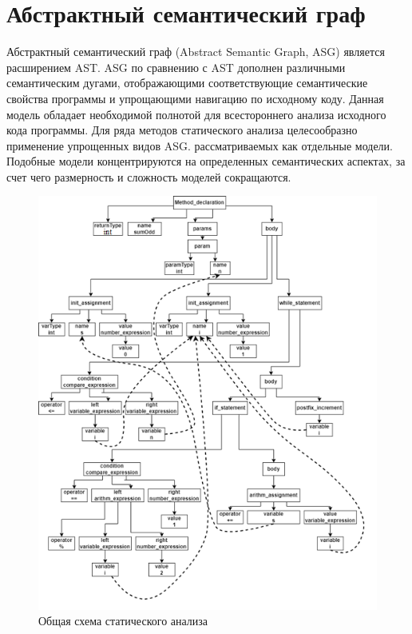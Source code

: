 \section{Абстрактный семантический граф} \label{ch1:sec2-abbr5}
Абстрактный семантический граф (Abstract Semantic Graph, ASG) является расширением AST. ASG по сравнению с AST дополнен различными семантическим дугами, отображающими соответствующие семантические свойства программы и упрощающими навигацию по исходному коду. Данная модель обладает необходимой полнотой для всестороннего анализа исходного кода программы. Для ряда методов статического анализа целесообразно применение упрощенных видов ASG. рассматриваемых как отдельные модели. Подобные модели концентрируются на определенных семантических аспектах, за счет чего размерность и сложность моделей сокращаются.
\begin{figure}[ht!] 
	\center
	\includegraphics [scale=1] {my_folder/images/my/6}
	\caption{Общая схема статического анализа } 
	\label{fig:6}  
\end{figure}
